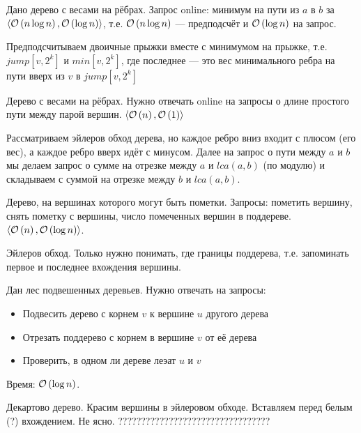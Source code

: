\begin{task}[2]
Дано дерево с весами на рёбрах. Запрос online: минимум на пути из $a$ в $b$ за $\langle \mathcal{O}\left(n\log{n}\right), \mathcal{O}\left(\log{n}\right) \rangle$, т.е. $\mathcal{O}\left(n\log{n}\right)$ --- предподсчёт и $\mathcal{O}\left(\log{n}\right)$ на запрос.
\end{task}
\begin{solution}
Предподсчитываем двоичные прыжки вместе с минимумом на прыжке, т.е.
$jump[v, 2^k]$ и $min[v, 2^k]$, где последнее --- это вес минимального ребра на пути вверх из $v$ в $jump[v, 2^k]$ \xqed
\end{solution}

\begin{task}[3]
Дерево с весами на рёбрах. Нужно отвечать online на запросы о длине простого пути между парой вершин. 
$\langle \mathcal{O}\left(n\right), \mathcal{O}\left(1\right) \rangle$
\end{task}
\begin{solution}
Рассматриваем эйлеров обход дерева, но каждое ребро вниз входит с плюсом (его вес), а каждое ребро вверх идёт с минусом.
Далее на запрос о пути между $a$ и $b$ мы делаем запрос о сумме на отрезке между $a$ и $lca(a,b)$ (по модулю) и складываем с суммой на отрезке между $b$ и $lca(a,b)$.
\end{solution}

\begin{task}[4]
Дерево, на вершинах которого могут быть пометки. Запросы: пометить вершину, снять пометку с вершины, число помеченных вершин в поддереве. $\langle \mathcal{O}\left(n\right), \mathcal{O}\left(\log{n}\right) \rangle$.
\end{task}
\begin{solution}
Эйлеров обход. Только нужно понимать, где границы поддерева, т.е. запоминать первое и последнее вхождения вершины.
\end{solution}


\begin{task}[8]
Дан лес подвешенных деревьев. Нужно отвечать на запросы:
\begin{itemize}
	\item Подвесить дерево с корнем $v$ к вершине $u$ другого дерева
	\item Отрезать поддерево с корнем в вершине $v$ от её дерева
	\item Проверить, в одном ли дереве леэат $u$ и $v$
\end{itemize}
Время: $\mathcal{O}\left(\log{n}\right)$.
\end{task}
\begin{solution}
Декартово дерево.
Красим вершины в эйлеровом обходе. Вставляем перед белым (?) вхождением.
Не ясно.
?????????????????????????????????
\end{solution}

